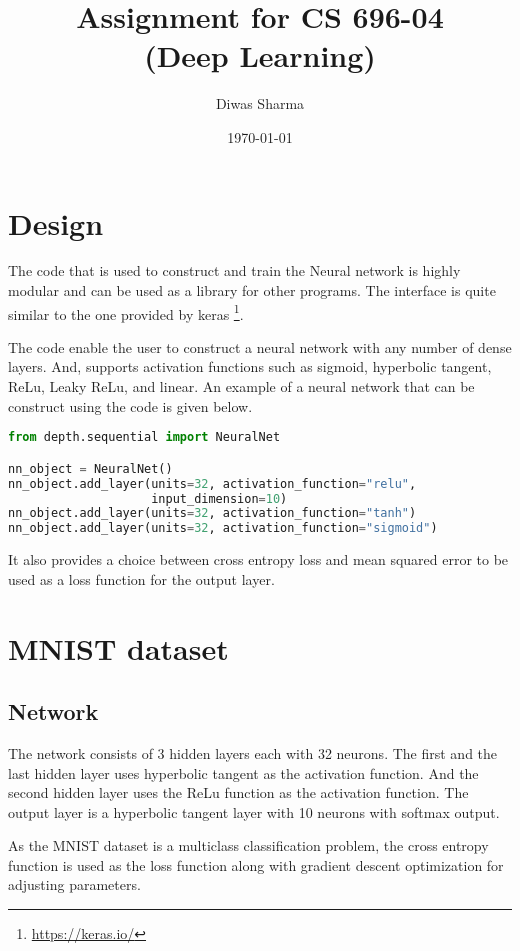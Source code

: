 \documentclass{article}
\title{Assignment for CS 696-04 \\ (Deep Learning)}
\author{Diwas Sharma}
\date{\today}
\begin{document}
\maketitle
\newpage

\section{Design}
The code that is used to construct and train the Neural network is highly modular and
can be used as a library for other programs. The interface is quite similar to the one
provided by keras \footnote{\url{https://keras.io/}}.

The code enable the user to construct a neural network with any number of dense
layers. And, supports activation functions such as sigmoid, hyperbolic tangent,
ReLu, Leaky ReLu, and linear. An example of a neural network that can be construct
using the code is given below.

\begin{lstlisting}[language=python]
from depth.sequential import NeuralNet

nn_object = NeuralNet()
nn_object.add_layer(units=32, activation_function="relu",
                    input_dimension=10)
nn_object.add_layer(units=32, activation_function="tanh")
nn_object.add_layer(units=32, activation_function="sigmoid")
\end{lstlisting}

It also provides a choice between cross entropy loss and mean squared
error to be used as a loss function for the output layer.

\section{MNIST dataset}
\subsection{Network}
The network consists of 3 hidden layers each with 32 neurons.  The first and the last
hidden layer uses hyperbolic tangent as the activation function. And the second
hidden layer uses the ReLu function as the activation function. The output layer
is a hyperbolic tangent layer with 10 neurons with softmax output.

As the MNIST dataset is a multiclass classification problem, the cross entropy function
is used as the loss function along with gradient descent optimization for adjusting
parameters.
\end{document}
